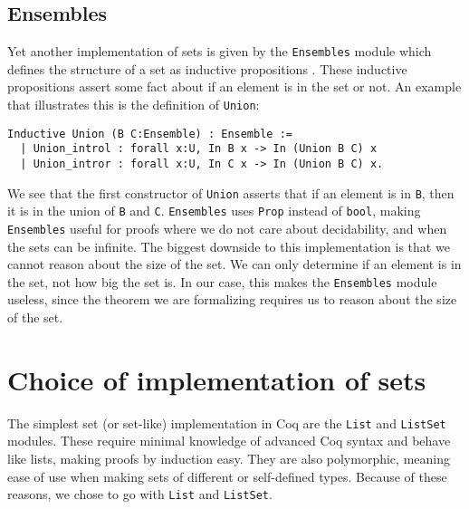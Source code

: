 \subsection{Ensembles}
\label{ssec:ensembles}

Yet another implementation of sets is given by the \lstinline{Ensembles} module
which defines the structure of a set as inductive propositions \cite{coqensembles}.
These inductive propositions assert some fact about if an element is in the set or not.
An example that illustrates this is the definition of \lstinline{Union}:

\begin{minipage}{\linewidth}
\begin{lstlisting}[language=Coq, label={lst:union_ensemble}, caption={\lstinline{Union} in \lstinline{Ensembles} module}]
Inductive Union (B C:Ensemble) : Ensemble :=
  | Union_introl : forall x:U, In B x -> In (Union B C) x
  | Union_intror : forall x:U, In C x -> In (Union B C) x.
\end{lstlisting}
\end{minipage}

We see that the first constructor of \lstinline{Union} asserts that if an element is in \lstinline{B},
then it is in the union of \lstinline{B} and \lstinline{C}.
\lstinline{Ensembles} uses \lstinline{Prop} instead of \lstinline{bool},
making \lstinline{Ensembles} useful for proofs where we do not care about decidability,
and when the sets can be infinite.
The biggest downside to this implementation is that we cannot reason about the size of the set.
We can only determine if an element is in the set, not how big the set is.
In our case, this makes the \lstinline{Ensembles} module useless, since the theorem we are formalizing requires us to reason about the
size of the set.

\section{Choice of implementation of sets}
\label{sec:choice_of_implementation_of_sets}

The simplest set (or set-like) implementation in Coq are the \lstinline{List} and \lstinline{ListSet} modules.
These require minimal knowledge of advanced Coq syntax and behave like lists, making proofs by induction easy.
They are also polymorphic, meaning ease of use when making sets of different or self-defined types.
Because of these reasons, we chose to go with \lstinline{List} and \lstinline{ListSet}.
